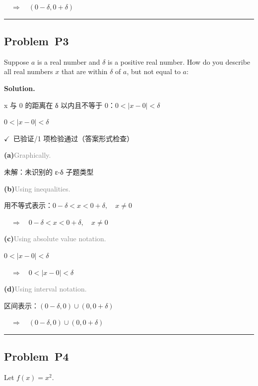 \documentclass[12pt, a4paper]{article}
\newcommand{\problem}[1]{\subsection*{Problem~#1}}
\newcommand{\solution}{%
  \par\noindent
  {\color{solutiongreen}\bfseries Solution.}\par
}
\newcommand{\verifyok}{\textcolor{solutiongreen}{\ensuremath{\checkmark}\ 已验证}}
\begin{document}
$\quad\Rightarrow\quad (0 - \delta, 0 + \delta)$


\vspace{0.8em}\hrule\vspace{0.8em}

\problem{P3}

\begin{stepbox}
Suppose $a$ is a real number and $\delta$ is a positive real number. How do you describe all real numbers $x$ that are within $\delta$ of $a$, but not equal to $a$:
\end{stepbox}

\solution

\begin{stepbox}
x 与 0 的距离在 δ 以内且不等于 0：$0 < |x - 0| < \delta$
\end{stepbox}

\begin{center}
$\boxed{0 < |x - 0| < \delta}$
\end{center}

\begin{verifybox}\small \verifyok{}/1 项检验通过（答案形式检查） \end{verifybox}

\vspace{0.3em}
\textbf{(a)}\quad \textcolor{gray}{\small Graphically.}

\textcolor{warnamber}{未解：未识别的 ε-δ 子题类型}

\textbf{(b)}\quad \textcolor{gray}{\small Using inequalities.}

用不等式表示：$0 - \delta < x < 0 + \delta, \quad x \neq 0$

$\quad\Rightarrow\quad 0 - \delta < x < 0 + \delta, \quad x \neq 0$

\textbf{(c)}\quad \textcolor{gray}{\small Using absolute value notation.}

$0 < |x - 0| < \delta$

$\quad\Rightarrow\quad 0 < |x - 0| < \delta$

\textbf{(d)}\quad \textcolor{gray}{\small Using interval notation.}

区间表示：$(0 - \delta, 0) \cup (0, 0 + \delta)$

$\quad\Rightarrow\quad (0 - \delta, 0) \cup (0, 0 + \delta)$


\vspace{0.8em}\hrule\vspace{0.8em}

\problem{P4}

\begin{stepbox}
Let $f(x) = x^2$.
\end{stepbox}
\end{document}
